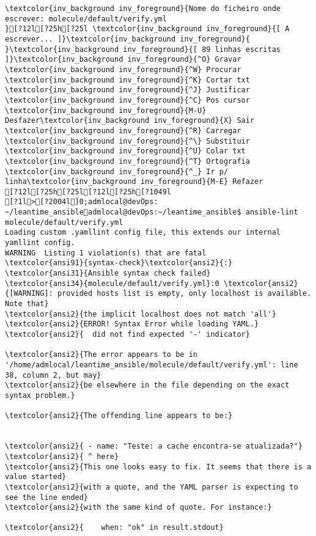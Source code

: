 \documentclass{scrartcl}
\begin{document}
\begin{Verbatim}
\textcolor{inv_background inv_foreground}{Nome do ficheiro onde escrever: molecule/default/verify.yml                                             }[?12l[?25h[?25l \textcolor{inv_background inv_foreground}{[ A escrever... ]}\textcolor{inv_background inv_foreground}{          }\textcolor{inv_background inv_foreground}{[ 89 linhas escritas ]}\textcolor{inv_background inv_foreground}{^O} Gravar     \textcolor{inv_background inv_foreground}{^W} Procurar   \textcolor{inv_background inv_foreground}{^K} Cortar txt \textcolor{inv_background inv_foreground}{^J} Justificar \textcolor{inv_background inv_foreground}{^C} Pos cursor \textcolor{inv_background inv_foreground}{M-U} Desfazer\textcolor{inv_background inv_foreground}{X} Sair       \textcolor{inv_background inv_foreground}{^R} Carregar   \textcolor{inv_background inv_foreground}{^\} Substituir \textcolor{inv_background inv_foreground}{^U} Colar txt  \textcolor{inv_background inv_foreground}{^T} Ortografia \textcolor{inv_background inv_foreground}{^_} Ir p/ linha\textcolor{inv_background inv_foreground}{M-E} Refazer
[?12l[?25h[?25l[?12l[?25h[?1049l
[?1l>[?2004l]0;admlocal@devOps: ~/leantime_ansibleadmlocal@devOps:~/leantime_ansible$ ansible-lint molecule/default/verify.yml 
Loading custom .yamllint config file, this extends our internal yamllint config.
WARNING  Listing 1 violation(s) that are fatal
\textcolor{ansi91}{syntax-check}\textcolor{ansi2}{:} \textcolor{ansi31}{Ansible syntax check failed}
\textcolor{ansi34}{molecule/default/verify.yml}:0 \textcolor{ansi2}{[WARNING]: provided hosts list is empty, only localhost is available. Note that}
\textcolor{ansi2}{the implicit localhost does not match 'all'}
\textcolor{ansi2}{ERROR! Syntax Error while loading YAML.}
\textcolor{ansi2}{  did not find expected '-' indicator}

\textcolor{ansi2}{The error appears to be in '/home/admlocal/leantime_ansible/molecule/default/verify.yml': line 38, column 2, but may}
\textcolor{ansi2}{be elsewhere in the file depending on the exact syntax problem.}

\textcolor{ansi2}{The offending line appears to be:}


\textcolor{ansi2}{ - name: "Teste: a cache encontra-se atualizada?"}
\textcolor{ansi2}{ ^ here}
\textcolor{ansi2}{This one looks easy to fix. It seems that there is a value started}
\textcolor{ansi2}{with a quote, and the YAML parser is expecting to see the line ended}
\textcolor{ansi2}{with the same kind of quote. For instance:}

\textcolor{ansi2}{    when: "ok" in result.stdout}


\end{Verbatim}
\end{document}
